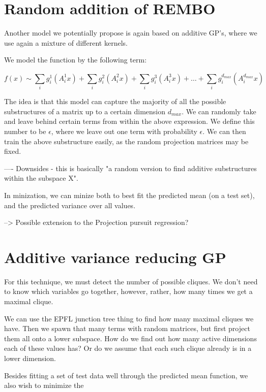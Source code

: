 \section{Random addition of REMBO}
Another model we potentially propose is again based on additive GP's, where we use again a mixture of different kernels.

We model the function by the following term:


\begin{equation}
f(x) \sim \sum_i g_i^1(A_i^1 x) + \sum_i g_i^2(A_i^2 x) + \sum_i g_i^3(A_i^3 x) + \ldots + \sum_i g_i^{d_{max}}(A_i^{d_{max}} x)
\end{equation}

The idea is that this model can capture the majority of all the possible substructures of a matrix up to a certain dimension $d_{max}$.
We can randomly take and leave behind certain terms from within the above expression.
We define this number to be $\epsilon$, where we leave out one term with probability $\epsilon$.
We can then train the above substructure easily, as the random projection matrices may be fixed.

----
Downsides - this is basically "a random version to find additive substructures within the subspace X".

In minization, we can minize both to best fit the predicted mean (on a test set), and the predicted variance over all values.

--> Possible extension to the Projection pursuit regression?

\section{Additive variance reducing GP}
For this technique, we must detect the number of possible cliques.
We don't need to know which variables go together, however, rather, how many times we get a maximal clique.

We can use the EPFL junction tree thing to find how many maximal cliques we have. 
Then we spawn that many terms with random matrices, but first project them all onto a lower subspace.
How do we find out how many active dimensions each of these values has?
Or do we assume that each such clique already is in a lower dimension.


Besides fitting a set of test data well through the predicted mean function, we also wish to minimize the 



